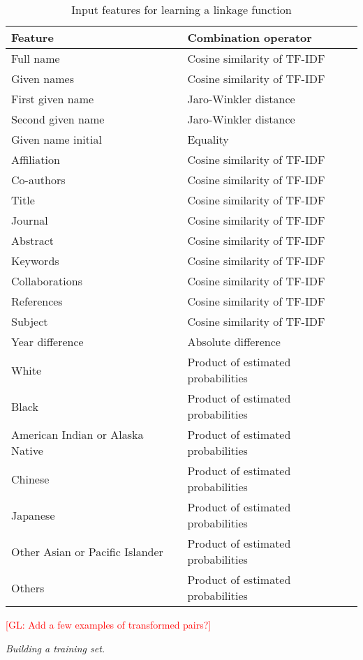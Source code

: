 \documentclass{article}
\newcommand{\glnote}[1]{\textcolor{red}{[GL: #1]}}
\begin{document}
\begin{table}
\caption{Input features for learning a linkage function}
\label{table:features}
\centering
\begin{tabular}{|l|l|}
  \hline
  \textbf{Feature} & \textbf{Combination operator}\\
  \hline
  \hline
  Full name & Cosine similarity of TF-IDF\\
  Given names & Cosine similarity of TF-IDF\\
  First given name & Jaro-Winkler distance\\
  Second given name & Jaro-Winkler distance\\
  Given name initial & Equality\\
  Affiliation & Cosine similarity of TF-IDF\\
  Co-authors & Cosine similarity of TF-IDF\\
  Title & Cosine similarity of TF-IDF\\
  Journal & Cosine similarity of TF-IDF\\
  Abstract & Cosine similarity of TF-IDF\\
  Keywords & Cosine similarity of TF-IDF\\
  Collaborations & Cosine similarity of TF-IDF\\
  References & Cosine similarity of TF-IDF\\
  Subject & Cosine similarity of TF-IDF\\
  Year difference & Absolute difference\\
  \hline
  White & Product of estimated probabilities\\
  Black & Product of estimated probabilities\\
  American Indian or Alaska Native & Product of estimated probabilities\\
  Chinese & Product of estimated probabilities\\
  Japanese & Product of estimated probabilities\\
  Other Asian or Pacific Islander & Product of estimated probabilities\\
  Others & Product of estimated probabilities\\
  \hline
\end{tabular}
\end{table}

\glnote{Add a few examples of transformed pairs?}


\textit{Building a training set.}
\end{document}
